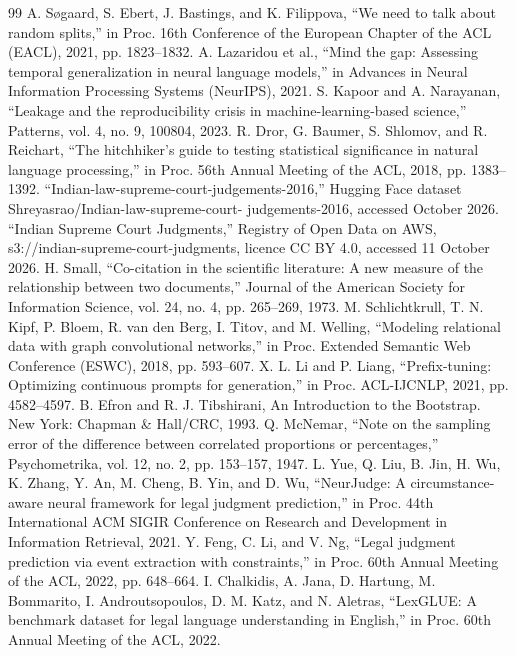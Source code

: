 \begin{thebibliography}{99}
 A. S{\o}gaard, S. Ebert, J. Bastings, and K. Filippova, ``We need to talk about random splits,'' in Proc. 16th Conference of the European Chapter of the ACL (EACL), 2021, pp. 1823--1832.
 A. Lazaridou et al., ``Mind the gap: Assessing temporal generalization in neural language models,'' in Advances in Neural Information Processing Systems (NeurIPS), 2021.
 S. Kapoor and A. Narayanan, ``Leakage and the reproducibility crisis in machine-learning-based science,'' Patterns, vol. 4, no. 9, 100804, 2023.
 R. Dror, G. Baumer, S. Shlomov, and R. Reichart, ``The hitchhiker's guide to testing statistical significance in natural language processing,'' in Proc. 56th Annual Meeting of the ACL, 2018, pp. 1383--1392.
 ``Indian-law-supreme-court-judgements-2016,'' Hugging Face dataset Shreyasrao/Indian-law-supreme-court- judgements-2016, accessed October 2026.
 ``Indian Supreme Court Judgments,'' Registry of Open Data on AWS, s3://indian-supreme-court-judgments, licence CC BY 4.0, accessed 11 October 2026.
 H. Small, ``Co-citation in the scientific literature: A new measure of the relationship between two documents,'' Journal of the American Society for Information Science, vol. 24, no. 4, pp. 265--269, 1973.
 M. Schlichtkrull, T. N. Kipf, P. Bloem, R. van den Berg, I. Titov, and M. Welling, ``Modeling relational data with graph convolutional networks,'' in Proc. Extended Semantic Web Conference (ESWC), 2018, pp. 593--607.
 X. L. Li and P. Liang, ``Prefix-tuning: Optimizing continuous prompts for generation,'' in Proc. ACL-IJCNLP, 2021, pp. 4582--4597.
 B. Efron and R. J. Tibshirani, An Introduction to the Bootstrap. New York: Chapman \& Hall/CRC, 1993.
 Q. McNemar, ``Note on the sampling error of the difference between correlated proportions or percentages,'' Psychometrika, vol. 12, no. 2, pp. 153--157, 1947.
 L. Yue, Q. Liu, B. Jin, H. Wu, K. Zhang, Y. An, M. Cheng, B. Yin, and D. Wu, ``NeurJudge: A circumstance-aware neural framework for legal judgment prediction,'' in Proc. 44th International ACM SIGIR Conference on Research and Development in Information Retrieval, 2021.
 Y. Feng, C. Li, and V. Ng, ``Legal judgment prediction via event extraction with constraints,'' in Proc. 60th Annual Meeting of the ACL, 2022, pp. 648--664.
 I. Chalkidis, A. Jana, D. Hartung, M. Bommarito, I. Androutsopoulos, D. M. Katz, and N. Aletras, ``LexGLUE: A benchmark dataset for legal language understanding in English,'' in Proc. 60th Annual Meeting of the ACL, 2022.

\end{thebibliography}
